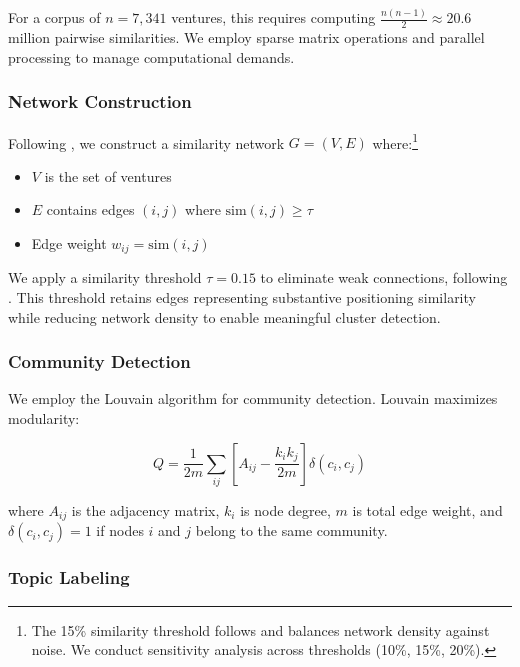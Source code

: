 \documentclass[../main.tex]{subfiles}
\begin{document}
For a corpus of $n = 7,341$ ventures, this requires computing $\frac{n(n-1)}{2} \approx 20.6$ million pairwise similarities. We employ sparse matrix operations and parallel processing to manage computational demands.

\subsubsection{Network Construction}

Following \cite{basole2019visual}, we construct a similarity network $G = (V, E)$ where:\footnote{The 15\% similarity threshold follows \cite{basole2019visual} and balances network density against noise. We conduct sensitivity analysis across thresholds (10\%, 15\%, 20\%).}

\begin{itemize}
    \item $V$ is the set of ventures
    \item $E$ contains edges $(i, j)$ where $\text{sim}(i, j) \geq \tau$
    \item Edge weight $w_{ij} = \text{sim}(i, j)$
\end{itemize}

We apply a similarity threshold $\tau = 0.15$ to eliminate weak connections, following \cite{basole2019visual}. This threshold retains edges representing substantive positioning similarity while reducing network density to enable meaningful cluster detection.

\subsubsection{Community Detection}

We employ the Louvain algorithm \cite{blondel2008fast} for community detection. Louvain maximizes modularity:

\begin{equation}
    Q = \frac{1}{2m} \sum_{ij} \left[ A_{ij} - \frac{k_i k_j}{2m} \right] \delta(c_i, c_j)
\end{equation}

where $A_{ij}$ is the adjacency matrix, $k_i$ is node degree, $m$ is total edge weight, and $\delta(c_i, c_j) = 1$ if nodes $i$ and $j$ belong to the same community.

\subsubsection{Topic Labeling}
\end{document}
